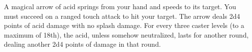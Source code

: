 \begin{spellinformation}
\end{spellinformation}
A magical arrow of acid springs from your hand and speeds to its target. You must succeed on a ranged touch attack to hit your target. The arrow deals 2d4 points of acid damage with no splash damage. For every three caster levels (to a maximum of 18th), the acid, unless somehow neutralized, lasts for another round, dealing another 2d4 points of damage in that round.


